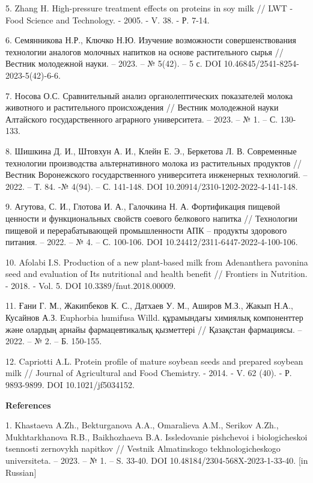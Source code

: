 5. Zhang H. High-pressure treatment effects on proteins in soy milk //
LWT - Food Science and Technology. - 2005. - V. 38. - Р. 7-14.

6. Семянникова Н.Р., Ключко Н.Ю. Изучение возможности совершенствования
технологии аналогов молочных напитков на основе растительного сырья //
Вестник молодежной науки. -- 2023. -- № 5(42). -- 5 с. DOI
10.46845/2541-8254-2023-5(42)-6-6.

7. Носова О.С. Сравнительный анализ органолептических показателей молока
животного и растительного происхождения // Вестник молодежной науки
Алтайского государственного аграрного университета. -- 2023. -- № 1. --
С. 130-133.

8. Шишкина Д. И., Штовхун А. И., Клейн Е. Э., Беркетова Л. В.
Современные технологии производства альтернативного молока из
растительных продуктов // Вестник Воронежского государственного
университета инженерных технологий. -- 2022. -- Т. 84. -№ 4(94). -- С.
141-148. DOI 10.20914/2310-1202-2022-4-141-148.

9. Агутова, С. И., Глотова И. А., Галочкина Н. А. Фортификация пищевой
ценности и функциональных свойств соевого белкового напитка //
Технологии пищевой и перерабатывающей промышленности АПК -- продукты
здорового питания. -- 2022. -- № 4. -- С. 100-106. DOI
10.24412/2311-6447-2022-4-100-106.

10. Afolabi I.S. Production of a new plant-based milk from Adenanthera
pavonina seed and evaluation of Its nutritional and health benefit //
Frontiers in Nutrition. - 2018. - Vol. 5. DOI 10.3389/fnut.2018.00009.

11. Ғани Г. М., Жакипбеков К. С., Датхаев У. М., Аширов М.З., Жакып
Н.А., Кусайнов А.З. Euphorbia humifusa Willd. құрамындағы химиялық
компоненттер және олардың арнайы фармацевтикалық қызметтері // Қазақстан
фармациясы. -- 2022. -- № 2. -- Б. 150-155.

12. Capriotti A.L. Protein profile of mature soybean seeds and prepared
soybean milk // Journal of Agricultural and Food Chemistry. - 2014. - V.
62 (40). - Р. 9893-9899. DOI 10.1021/jf5034152.

{\bfseries References}

1. Khastaeva A.Zh., Bekturganova A.A., Omaralieva A.M., Serikov A.Zh.,
Mukhtarkhanova R.B., Baikhozhaeva B.A. Issledovanie pishchevoi i
biologicheskoi tsennosti zernovykh napitkov // Vestnik Almatinskogo
tekhnologicheskogo universiteta. -- 2023. -- № 1. -- S. 33-40. DOI
10.48184/2304-568X-2023-1-33-40. {[}in Russian{]}


